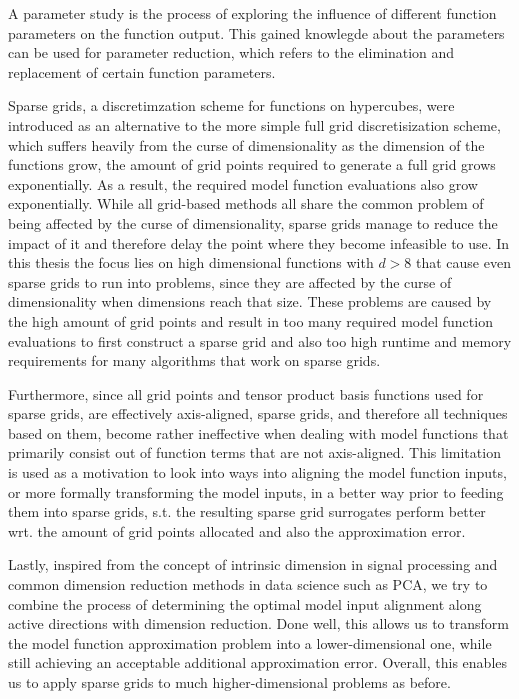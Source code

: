 \documentclass[
  a4paper,  %
  twoside,  %
  bibliography=totoc,
  headsepline,
  cleardoublepage=empty,
  parskip=half,
  draft=false
]{scrbook}
\begin{document}
A parameter study is the process of exploring the influence of different function parameters on the function output.
This gained knowlegde about the parameters can be used for parameter reduction, which refers to the elimination and replacement of certain function parameters.

Sparse grids, a discretimzation scheme for functions on hypercubes, were introduced as an alternative to the more simple full grid discretisization scheme, which suffers heavily from the curse of dimensionality as the dimension of the functions grow, the amount of grid points required to generate a full grid grows exponentially.
As a result, the required model function evaluations also grow exponentially.
While all grid-based methods all share the common problem of being affected by the curse of dimensionality, sparse grids manage to reduce the impact of it and therefore delay the point where they become infeasible to use.
In this thesis the focus lies on high dimensional functions with $d > 8$ that cause even sparse grids to run into problems, since they are affected by the curse of dimensionality when dimensions reach that size.
These problems are caused by the high amount of grid points and result in too many required model function evaluations to first construct a sparse grid and also too high runtime and memory requirements for many algorithms that work on sparse grids.

Furthermore, since all grid points and tensor product basis functions used for sparse grids, are effectively axis-aligned, sparse grids, and therefore all techniques based on them, become rather ineffective when dealing with model functions that primarily consist out of function terms that are not axis-aligned.
This limitation is used as a motivation to look into ways into aligning the model function inputs, or more formally transforming the model inputs, in a better way prior to feeding them into sparse grids, s.t. the resulting sparse grid surrogates perform better wrt. the amount of grid points allocated and also the approximation error. 

Lastly, inspired from the concept of intrinsic dimension in signal processing and common dimension reduction methods in data science such as PCA, we try to combine the process of determining the optimal model input alignment along active directions with dimension reduction.
Done well, this allows us to transform the model function approximation problem into a lower-dimensional one, while still achieving an acceptable additional approximation error.
Overall, this enables us to apply sparse grids to much higher-dimensional problems as before.
\end{document}
